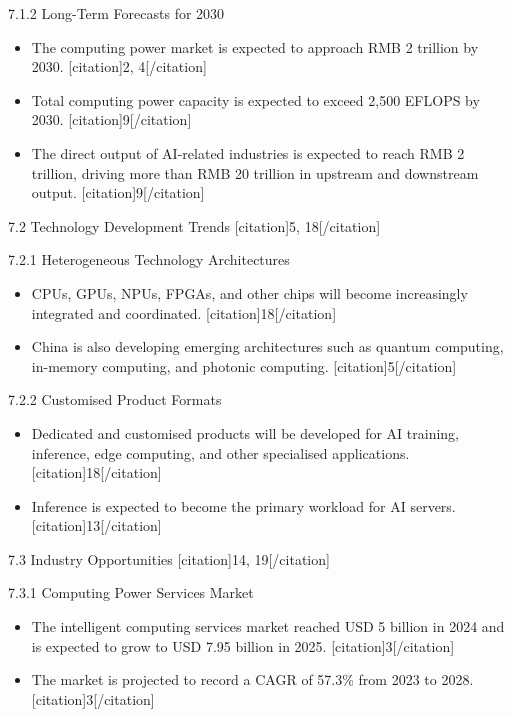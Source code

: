 \documentclass{huawei}
\begin{document}
\begin{tcolorbox}[
    title={Example of Hierarchical Research Outline},
    colback=gray!5,
    colframe=gray!40,
    fonttitle=\bfseries,
    boxrule=0.5pt,
    arc=2pt,
    breakable
]
\textcolor{TitleRed}{7.1.2 Long-Term Forecasts for 2030}
\begin{itemize}[leftmargin=1em, listparindent=\parindent]
\item The computing power market is expected to approach RMB 2 trillion by 2030. [citation]2, 4[/citation]
\item Total computing power capacity is expected to exceed 2,500 EFLOPS by 2030. [citation]9[/citation]
\item The direct output of AI-related industries is expected to reach RMB 2 trillion, driving more than RMB 20 trillion in upstream and downstream output. [citation]9[/citation]
\end{itemize}

\textcolor{TitleRed}{7.2 Technology Development Trends [citation]5, 18[/citation]}

\textcolor{TitleRed}{7.2.1 Heterogeneous Technology Architectures}
\begin{itemize}[leftmargin=1em, listparindent=\parindent]
\item CPUs, GPUs, NPUs, FPGAs, and other chips will become increasingly integrated and coordinated. [citation]18[/citation]
\item China is also developing emerging architectures such as quantum computing, in-memory computing, and photonic computing. [citation]5[/citation]
\end{itemize}

\textcolor{TitleRed}{7.2.2 Customised Product Formats}
\begin{itemize}[leftmargin=1em, listparindent=\parindent]
\item Dedicated and customised products will be developed for AI training, inference, edge computing, and other specialised applications. [citation]18[/citation]
\item Inference is expected to become the primary workload for AI servers. [citation]13[/citation]
\end{itemize}

\textcolor{TitleRed}{7.3 Industry Opportunities [citation]14, 19[/citation]}

\textcolor{TitleRed}{7.3.1 Computing Power Services Market}
\begin{itemize}[leftmargin=1em, listparindent=\parindent]
\item The intelligent computing services market reached USD 5 billion in 2024 and is expected to grow to USD 7.95 billion in 2025. [citation]3[/citation]
\item The market is projected to record a CAGR of 57.3\% from 2023 to 2028. [citation]3[/citation]
\end{itemize}


\end{tcolorbox}
\end{document}
